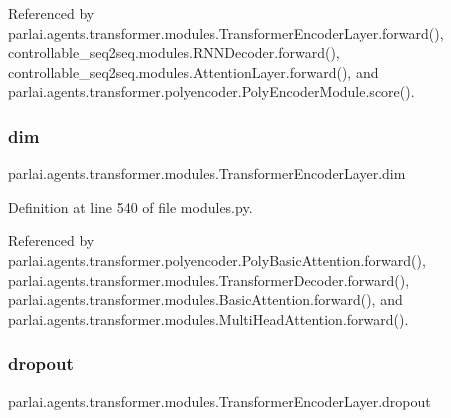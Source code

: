 Referenced by parlai.\+agents.\+transformer.\+modules.\+Transformer\+Encoder\+Layer.\+forward(), controllable\+\_\+seq2seq.\+modules.\+R\+N\+N\+Decoder.\+forward(), controllable\+\_\+seq2seq.\+modules.\+Attention\+Layer.\+forward(), and parlai.\+agents.\+transformer.\+polyencoder.\+Poly\+Encoder\+Module.\+score().

\mbox{\label{classparlai_1_1agents_1_1transformer_1_1modules_1_1TransformerEncoderLayer_ae0f31a52dac8d678fdf6ba573201e7d7}} 
\subsubsection{\texorpdfstring{dim}{dim}}
{\footnotesize\ttfamily parlai.\+agents.\+transformer.\+modules.\+Transformer\+Encoder\+Layer.\+dim}



Definition at line 540 of file modules.\+py.



Referenced by parlai.\+agents.\+transformer.\+polyencoder.\+Poly\+Basic\+Attention.\+forward(), parlai.\+agents.\+transformer.\+modules.\+Transformer\+Decoder.\+forward(), parlai.\+agents.\+transformer.\+modules.\+Basic\+Attention.\+forward(), and parlai.\+agents.\+transformer.\+modules.\+Multi\+Head\+Attention.\+forward().

\mbox{\label{classparlai_1_1agents_1_1transformer_1_1modules_1_1TransformerEncoderLayer_a3bcd00a8073a48b6a1626fccb87be143}} 
\subsubsection{\texorpdfstring{dropout}{dropout}}
{\footnotesize\ttfamily parlai.\+agents.\+transformer.\+modules.\+Transformer\+Encoder\+Layer.\+dropout}



